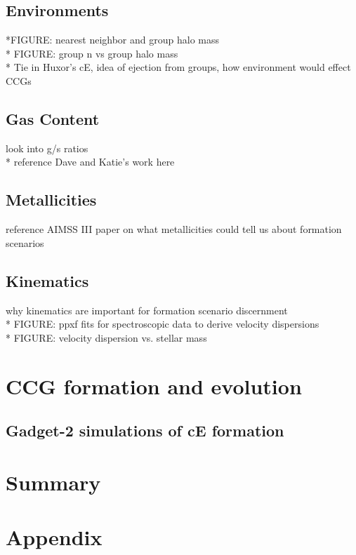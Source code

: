 \documentclass[iop,apj,twocolappendix]{emulateapj}
\begin{document}
\subsection{Environments}
\noindent 
 *FIGURE: nearest neighbor and group halo mass\\
* FIGURE: group n vs group halo mass  \\
* Tie in Huxor's cE, idea of ejection from groups, how environment would effect CCGs

\subsection{Gas Content}
\noindent * look into g/s ratios \\
* reference Dave and Katie's work here

\subsection{Metallicities}
\noindent * reference AIMSS III paper on what metallicities could tell us about formation scenarios

\subsection{Kinematics}
\noindent * why kinematics are important for formation scenario discernment\\
* FIGURE: ppxf fits for spectroscopic data to derive velocity dispersions \\
* FIGURE: velocity dispersion vs. stellar mass

\section{CCG formation and evolution} %

\subsection{Gadget-2 simulations of cE formation}



\section{Summary}






\section{Appendix}
\end{document}
